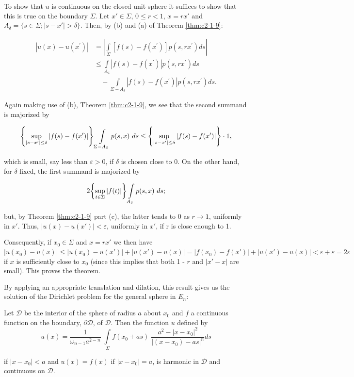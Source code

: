 To show that $u$ is continuous on the closed unit sphere it suffices to show that this is true on the boundary $\Sigma$. Let $x' \in \Sigma$, $0 \leq r < 1$, $x = rx'$ and $A_\delta = \{s \in \Sigma; |s - x'| > \delta\}$. Then, by (b) and (a) of Theorem \ref{thm:c2-1-9}:

\[
\begin{aligned}|u(x)-u(x^{\prime})|&=\left|\int\limits_{\Sigma}[f(s)-f(x^{\prime})]p(s,rx^{\prime})ds\right|\\&\leq\int\limits_{A_\delta}|f(s)-f(x^{\prime})|p(s,rx^{\prime})ds\\&\quad+\int\limits_{\Sigma-A_\delta}|f(s)-f(x^{\prime})|p(s,rx^{\prime})ds.\end{aligned}
\]

Again making use of (b), Theorem \ref{thm:c2-1-9}, we see that the second summand is majorized by

\[
\left\{\sup_{|s-x^{\prime}|\leq\delta}|f(s)-f(x^{\prime})|\right\}\intop_{\Sigma-A_{\delta}}p(s,x)\mathop{}{d}s\leq\left\{\sup_{|s-x^{\prime}|\leq\delta}|f(s)-f(x^{\prime})|\right\}\cdot1,
\]

which is small, say less than $\varepsilon > 0$, if $\delta$ is chosen close to 0. On the other hand, for $\delta$ fixed, the first summand is majorized by

\[
2\biggl\{\sup_{t\in\Sigma}|f(t)|\biggr\}\intop_{A_{\delta}}p(s,x)\mathop{}{d}s;
\]

but, by Theorem \ref{thm:c2-1-9} part (c), the latter tends to 0 as $r \to 1$, uniformly in $x'$. Thus, $|u(x) - u(x')| < \varepsilon$, uniformly in $x'$, if r is close enough to 1.

Consequently, if $x_0 \in \Sigma$ and $x = rx'$ we then have $|u(x_0) - u(x)| \leq |u(x_0) - u(x')| + |u(x') - u(x)| = |f(x_0) - f(x')| + |u(x') - u(x)| < \varepsilon + \varepsilon = 2\varepsilon$ if $x$ is sufficiently close to $x_0$ (since this implies that both 1 - $r$ and $|x' - x|$ are small). This proves the theorem.

By applying an appropriate translation and dilation, this result gives us the solution of the Dirichlet problem for the general sphere in $E_{n}$:

\begin{corollary}
\label{cor:c2-1-11}
Let $\mathcal{D}$ be the interior of the sphere of radius $a$ about $x_0$ and $f$ a continuous function on the boundary, $\partial\mathcal{D}$, of $\mathcal{D}$. Then the function $u$ defined by
\[
u(x)=\frac{1}{\omega_{n-1}a^{2-n}}\;\int\limits_{\Sigma}f(x_{0}+a s)\;\frac{a^{2}-|x-x_{0}|^{2}}{|(x-x_{0})-a s|^{n}}d s
\]

if $|x - x_0| < a$ and $u(x) = f(x)$ if $|x - x_0| = a$, is harmonic in $\mathcal{D}$ and continuous on $\mathcal{D}$.
\end{corollary}

